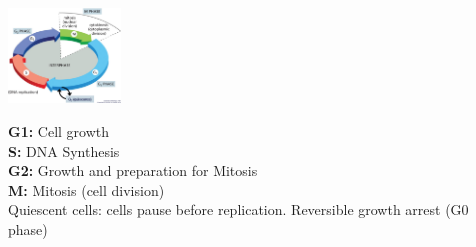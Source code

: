 \begin{minipage}{0.45\linewidth}
    \includegraphics[width=30mm]{src/Images/cell_cycle.png}
\end{minipage}
\begin{minipage}{0.45\linewidth}
    \textbf{G1:} Cell growth \\
    \textbf{S:} DNA Synthesis \\
    \textbf{G2:} Growth and preparation for Mitosis \\
    \textbf{M:} Mitosis (cell division) \\

    Quiescent cells: cells pause before replication. Reversible growth arrest (G0 phase) \\
\end{minipage}